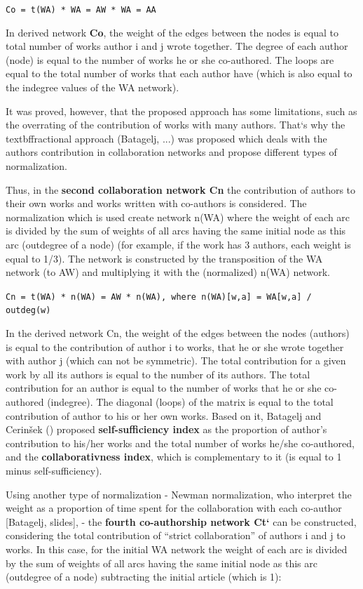 \documentclass[11pt]{article} %
\begin{document}
\texttt{Co = t(WA) * WA = AW * WA = AA} \medskip  

In derived network  \textbf{Co}, the weight of the edges between the nodes is equal to total number of works author i and j wrote together. The degree of each author (node) is equal to the number of works he or she co-authored. The loops are equal to the total number of works that each author have (which is also equal to the indegree values of the WA network). \medskip 

It was proved, however, that the proposed approach has some limitations, such as the overrating of the contribution of works with many authors. That`s why the textbf{fractional approach} (Batagelj, ...) was proposed which deals with the authors contribution in collaboration networks and propose different types of normalization. \medskip 

Thus, in the \textbf{second collaboration network Cn} the contribution of authors to their own works and works written with co-authors is considered. The normalization which is used create network n(WA) where the weight of each arc is divided by the sum of weights of all arcs having the same initial node as this arc (outdegree of a node) (for example, if the work has 3 authors, each weight is equal to 1/3). The network is constructed by the transposition of the WA network (to AW) and multiplying it with the (normalized) n(WA) network.\medskip 

\texttt{Cn = t(WA) * n(WA) = AW * n(WA), where n(WA)[w,a] = WA[w,a] / outdeg(w)} \medskip 

In the derived network Cn, the weight of the edges between the nodes (authors) is equal to the contribution of author i to works, that he or she wrote together with author j (which can not be symmetric). The total contribution for a given work by all its authors is equal to the number of its authors. The total contribution for an author is equal to the number of works that he or she co-authored (indegree). The diagonal (loops) of the matrix is equal to the total contribution of author to his or her own works. Based on it, Batagelj and Cerinšek () proposed \textbf{self-sufficiency index} as the proportion of author's contribution to his/her works and the total number of works he/she co-authored, and the \textbf{collaborativness index}, which is complementary to it (is equal to 1 minus self-sufficiency). \medskip 

Using another type of normalization - Newman normalization, who interpret the weight as a proportion of time spent for the collaboration with each co-author [Batagelj, slides], - the \textbf{fourth co-authorship network Ct`} can be constructed, considering the total contribution of “strict collaboration” of authors i and j to works. In this case, for the initial WA network the weight of each arc is divided by the sum of weights of all arcs having the same initial node as this arc (outdegree of a node) subtracting the initial article (which is 1): \medskip 
\end{document}
